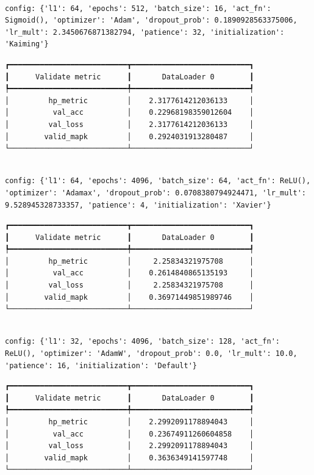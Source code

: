 \documentclass[
  letterpaper,
  DIV=11,
  numbers=noendperiod]{scrreprt}
\begin{document}
\begin{verbatim}

config: {'l1': 64, 'epochs': 512, 'batch_size': 16, 'act_fn': Sigmoid(), 'optimizer': 'Adam', 'dropout_prob': 0.1890928563375006, 'lr_mult': 2.3450676871382794, 'patience': 32, 'initialization': 'Kaiming'}
\end{verbatim}

\begin{verbatim}
┏━━━━━━━━━━━━━━━━━━━━━━━━━━━┳━━━━━━━━━━━━━━━━━━━━━━━━━━━┓
┃      Validate metric      ┃       DataLoader 0        ┃
┡━━━━━━━━━━━━━━━━━━━━━━━━━━━╇━━━━━━━━━━━━━━━━━━━━━━━━━━━┩
│         hp_metric         │    2.3177614212036133     │
│          val_acc          │    0.22968198359012604    │
│         val_loss          │    2.3177614212036133     │
│        valid_mapk         │    0.2924031913280487     │
└───────────────────────────┴───────────────────────────┘
\end{verbatim}

\begin{verbatim}

config: {'l1': 64, 'epochs': 4096, 'batch_size': 64, 'act_fn': ReLU(), 'optimizer': 'Adamax', 'dropout_prob': 0.0708380794924471, 'lr_mult': 9.528945328733357, 'patience': 4, 'initialization': 'Xavier'}
\end{verbatim}

\begin{verbatim}
┏━━━━━━━━━━━━━━━━━━━━━━━━━━━┳━━━━━━━━━━━━━━━━━━━━━━━━━━━┓
┃      Validate metric      ┃       DataLoader 0        ┃
┡━━━━━━━━━━━━━━━━━━━━━━━━━━━╇━━━━━━━━━━━━━━━━━━━━━━━━━━━┩
│         hp_metric         │     2.25834321975708      │
│          val_acc          │    0.2614840865135193     │
│         val_loss          │     2.25834321975708      │
│        valid_mapk         │    0.36971449851989746    │
└───────────────────────────┴───────────────────────────┘
\end{verbatim}

\begin{verbatim}

config: {'l1': 32, 'epochs': 4096, 'batch_size': 128, 'act_fn': ReLU(), 'optimizer': 'AdamW', 'dropout_prob': 0.0, 'lr_mult': 10.0, 'patience': 16, 'initialization': 'Default'}
\end{verbatim}

\begin{verbatim}
┏━━━━━━━━━━━━━━━━━━━━━━━━━━━┳━━━━━━━━━━━━━━━━━━━━━━━━━━━┓
┃      Validate metric      ┃       DataLoader 0        ┃
┡━━━━━━━━━━━━━━━━━━━━━━━━━━━╇━━━━━━━━━━━━━━━━━━━━━━━━━━━┩
│         hp_metric         │    2.2992091178894043     │
│          val_acc          │    0.23674911260604858    │
│         val_loss          │    2.2992091178894043     │
│        valid_mapk         │    0.3636349141597748     │
└───────────────────────────┴───────────────────────────┘
\end{verbatim}
\end{document}
